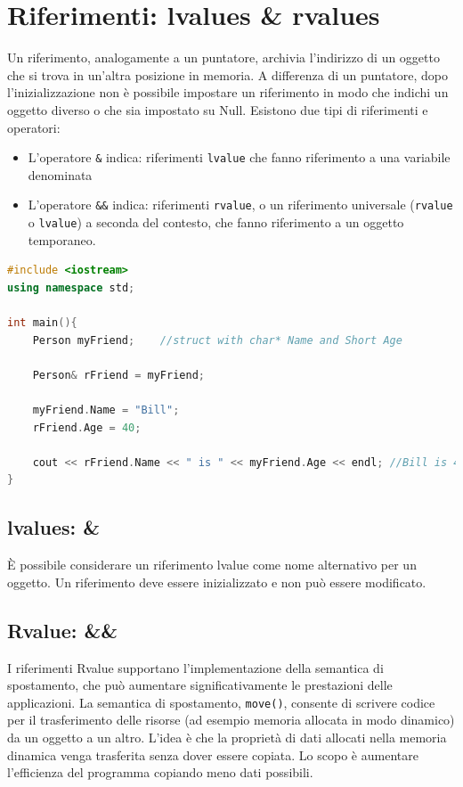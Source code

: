 \section{Riferimenti: lvalues \& rvalues}

Un riferimento, analogamente a un puntatore, archivia l'indirizzo di un oggetto che si trova in un'altra posizione in memoria. A differenza di un puntatore, dopo l'inizializzazione non è possibile impostare un riferimento in modo che indichi un oggetto diverso o che sia impostato su Null. 
Esistono due tipi di riferimenti e operatori:
\begin{itemize}
    \item L'operatore \verb|&| indica: riferimenti \verb|lvalue| che fanno riferimento a una variabile denominata
    \item L'operatore \verb|&&| indica: riferimenti \verb|rvalue|, o un riferimento universale (\verb|rvalue| o \verb|lvalue|) a seconda del contesto,  che fanno riferimento a un oggetto temporaneo.
\end{itemize}

\begin{lstlisting}[language=C++]
#include <iostream>
using namespace std;

int main(){
    Person myFriend;    //struct with char* Name and Short Age
   
    Person& rFriend = myFriend;

    myFriend.Name = "Bill";
    rFriend.Age = 40;

    cout << rFriend.Name << " is " << myFriend.Age << endl; //Bill is 40
}
\end{lstlisting}

\subsection{lvalues: \&}
È possibile considerare un riferimento lvalue come nome alternativo per un oggetto.
Un riferimento deve essere inizializzato e non può essere modificato.


\subsection{Rvalue: \&\&}
I riferimenti Rvalue supportano l'implementazione della semantica di spostamento, che può aumentare significativamente le prestazioni delle applicazioni. La semantica di spostamento, \verb|move()|, consente di scrivere codice per il trasferimento delle risorse (ad esempio memoria allocata in modo dinamico) da un oggetto a un altro.
L’idea è che la proprietà di dati allocati nella memoria dinamica venga trasferita senza dover essere copiata. Lo scopo è aumentare l’efficienza del programma copiando meno dati possibili.

